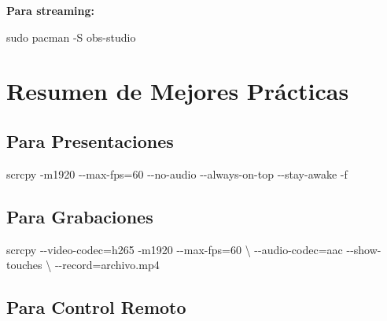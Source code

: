 \documentclass[
  doc,
  floatsintext,
  longtable,
  a4paper,
  nolmodern,
  notxfonts,
  notimes,
  12pt,
  colorlinks=true,linkcolor=blue,citecolor=blue,urlcolor=blue]{apa7}
\newenvironment{Shaded}{\begin{snugshade}}{\end{snugshade}}
\newcommand{\AttributeTok}[1]{\textcolor[rgb]{0.40,0.45,0.13}{#1}}
\newcommand{\DataTypeTok}[1]{\textcolor[rgb]{0.68,0.00,0.00}{#1}}
\newcommand{\ExtensionTok}[1]{\textcolor[rgb]{0.00,0.23,0.31}{#1}}
\newcommand{\FunctionTok}[1]{\textcolor[rgb]{0.28,0.35,0.67}{#1}}
\newcommand{\NormalTok}[1]{\textcolor[rgb]{0.00,0.23,0.31}{#1}}
\newcommand{\OperatorTok}[1]{\textcolor[rgb]{0.37,0.37,0.37}{#1}}
\begin{document}
\textbf{Para streaming:}

\begin{Shaded}
\begin{Highlighting}[]
\FunctionTok{sudo}\NormalTok{ pacman }\AttributeTok{{-}S}\NormalTok{ obs{-}studio}
\end{Highlighting}
\end{Shaded}

\section{Resumen de Mejores
Prácticas}\label{resumen-de-mejores-pruxe1cticas}

\subsection{Para Presentaciones}\label{para-presentaciones}

\begin{Shaded}
\begin{Highlighting}[]
\ExtensionTok{scrcpy} \AttributeTok{{-}m1920} \AttributeTok{{-}{-}max{-}fps}\OperatorTok{=}\NormalTok{60 }\AttributeTok{{-}{-}no{-}audio} \AttributeTok{{-}{-}always{-}on{-}top} \AttributeTok{{-}{-}stay{-}awake} \AttributeTok{{-}f}
\end{Highlighting}
\end{Shaded}

\subsection{Para Grabaciones}\label{para-grabaciones}

\begin{Shaded}
\begin{Highlighting}[]
\ExtensionTok{scrcpy} \AttributeTok{{-}{-}video{-}codec}\OperatorTok{=}\NormalTok{h265 }\AttributeTok{{-}m1920} \AttributeTok{{-}{-}max{-}fps}\OperatorTok{=}\NormalTok{60 }\DataTypeTok{\textbackslash{}}
  \AttributeTok{{-}{-}audio{-}codec}\OperatorTok{=}\NormalTok{aac }\AttributeTok{{-}{-}show{-}touches} \DataTypeTok{\textbackslash{}}
  \AttributeTok{{-}{-}record}\OperatorTok{=}\NormalTok{archivo.mp4}
\end{Highlighting}
\end{Shaded}

\subsection{Para Control Remoto}\label{para-control-remoto}
\end{document}
